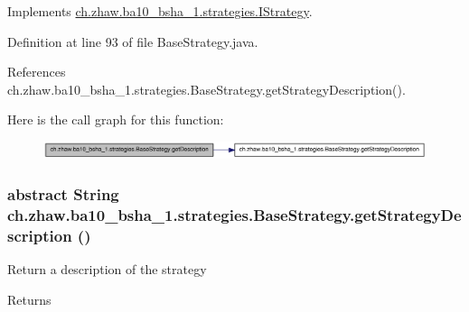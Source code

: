 Implements \hyperlink{interfacech_1_1zhaw_1_1ba10__bsha__1_1_1strategies_1_1IStrategy_ab1ebc130da7b0792d736a8b5f9cf595d}{ch.zhaw.ba10\_\-bsha\_\-1.strategies.IStrategy}.

Definition at line 93 of file BaseStrategy.java.

References ch.zhaw.ba10\_\-bsha\_\-1.strategies.BaseStrategy.getStrategyDescription().

Here is the call graph for this function:\nopagebreak
\begin{figure}[H]
\begin{center}
\leavevmode
\includegraphics[width=345pt]{classch_1_1zhaw_1_1ba10__bsha__1_1_1strategies_1_1BaseStrategy_a56e779e4ce93ac1570b34bcde23e7455_cgraph}
\end{center}
\end{figure}
\hypertarget{classch_1_1zhaw_1_1ba10__bsha__1_1_1strategies_1_1BaseStrategy_a75fdb36932ad701f6375cc1fe718056b}{
\subsubsection[{getStrategyDescription}]{\setlength{\rightskip}{0pt plus 5cm}abstract String ch.zhaw.ba10\_\-bsha\_\-1.strategies.BaseStrategy.getStrategyDescription ()}}
\label{classch_1_1zhaw_1_1ba10__bsha__1_1_1strategies_1_1BaseStrategy_a75fdb36932ad701f6375cc1fe718056b}
Return a description of the strategy

\begin{DoxyReturn}{Returns}

\end{DoxyReturn}


